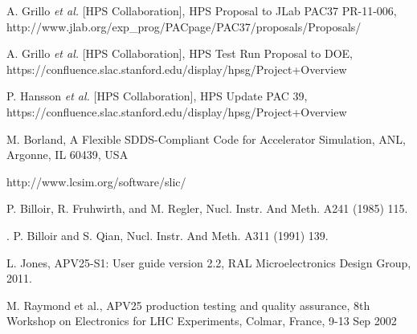 \begin{thebibliography}{99}


 A. Grillo {\it et al.} [HPS Collaboration], HPS Proposal to JLab PAC37 PR-11-006,
 http://www.jlab.org/exp\_prog/PACpage/PAC37/proposals/Proposals/

 A. Grillo {\it et al.} [HPS Collaboration], HPS Test Run Proposal to DOE, 
https://confluence.slac.stanford.edu/display/hpsg/Project+Overview

 P. Hansson {\it et al.} [HPS Collaboration], HPS Update PAC 39, 
https://confluence.slac.stanford.edu/display/hpsg/Project+Overview



 



 M. Borland, A Flexible SDDS-Compliant Code for Accelerator Simulation, ANL, Argonne, IL 60439, USA
 
  http://www.lcsim.org/software/slic/
 
 P. Billoir, R. Fruhwirth, and M. Regler, Nucl. Instr. And Meth. A241 (1985) 115. 

  . P. Billoir and S. Qian, Nucl. Instr. And Meth. A311 (1991) 139. 

 L. Jones, APV25-S1: User guide version 2.2, RAL Microelectronics Design Group, 2011.

 M. Raymond et al., APV25 production testing and quality assurance, 8th Workshop on Electronics for LHC
	              Experiments, Colmar, France, 9-13 Sep 2002
	               


\end{thebibliography} 

